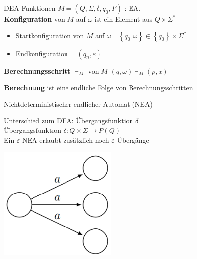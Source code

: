 \begin{KR}{DEA Funktionen}
    $M=\left(Q, \Sigma, \delta, q_{0}, F\right)$ : EA.\\ \textbf{Konfiguration} von $M$ auf $\omega$ ist ein Element aus $Q \times \Sigma^{*}$
    \begin{itemize}
    \item Startkonfiguration von $M$ auf $\omega \quad \left\{q_{0}, \omega\right\} \in\left\{q_{0}\right\} \times \Sigma^{*}$
    \item Endkonfiguration $\quad \left(q_{n}, \varepsilon\right)$
    \end{itemize}

    \textbf{Berechnungsschritt} $\vdash_{M}$ von $M$
    $
    (q, \omega) \vdash_{M}(p, x)
    $

    \textbf{Berechnung} ist eine endliche Folge von Berechnungsschritten
\end{KR}


\begin{minipage}{0.75\linewidth}
\begin{definition}{Nichtdeterministischer endlicher Automat (NEA)}
    
        Unterschied zum DEA: Übergangsfunktion $\delta$\\
        Übergangsfunktion $\delta: Q \times \Sigma \rightarrow P(Q)$\\
        Ein $\varepsilon$-NEA erlaubt zusätzlich noch $\varepsilon$-Übergänge
\end{definition}
\end{minipage}
\begin{minipage}{0.2\linewidth}
    \includegraphics[width=0.9\linewidth]{images/ndea.png}
\end{minipage}



